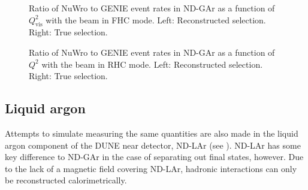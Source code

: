 \begin{figure}[h]
	\begin{minipage}[t]{.5\linewidth}
		\begin{adjustbox}{max totalsize=\linewidth, center}
			
		\end{adjustbox}
	\end{minipage}
 	\hfill
 	\begin{minipage}[t]{.5\linewidth}
 		\begin{adjustbox}{max totalsize=\linewidth, center}
 			
 		\end{adjustbox}
 	\end{minipage}
 	\caption[Comparison of NuWro and GENIE in $Q^{2}_{\textrm{vis}}$ for FHC]{Ratio of NuWro to GENIE event rates in ND-GAr as a function of $Q^{2}_{\textrm{vis}}$ with the beam in FHC mode. Left: Reconstructed selection. Right: True selection.}
 	\label{fig:Q2CompFhc}
\end{figure}

\begin{figure}[h]
	\begin{minipage}[t]{.5\linewidth}
		\begin{adjustbox}{max totalsize=\linewidth, center}
			
		\end{adjustbox}
	\end{minipage}
	\hfill
	\begin{minipage}[t]{.5\linewidth}
		\begin{adjustbox}{max totalsize=\linewidth, center}
			
		\end{adjustbox}
	\end{minipage}
	\caption[Comparison of NuWro and GENIE in $Q^{2}$ for RHC]{Ratio of NuWro to GENIE event rates in ND-GAr as a function of $Q^{2}$ with the beam in RHC mode. Left: Reconstructed selection. Right: True selection.}
	\label{fig:Q2CompRhc}
\end{figure}

\subsection{Liquid argon}

Attempts to simulate measuring the same quantities are also made in the liquid argon component of the DUNE near detector, ND-LAr (see ).
ND-LAr has some key difference to ND-GAr in the case of separating out final states, however. 
Due to the lack of a magnetic field covering ND-LAr, hadronic interactions can only be reconstructed calorimetrically.

